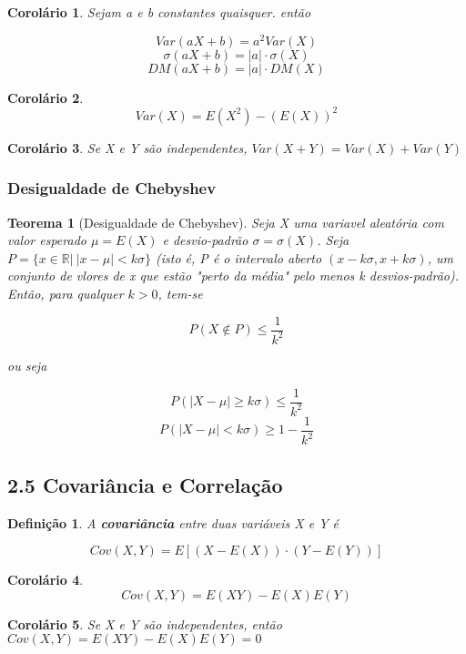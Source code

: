 \documentclass[12pt]{article}
\newtheorem{theorem}{Teorema}[section]
\newtheorem{corollary}{Corolário}[theorem]
\newtheorem{definition}{Definição}
\begin{document}
\begin{corollary}
    Sejam a e b constantes quaisquer. então
    
    $$Var(a X + b) = a^2 Var(X)$$
    $$\sigma (a X + b) = |a| \cdot \sigma(X)$$
    $$D M(a X + b) = |a| \cdot D M(X)$$
\end{corollary}

\begin{corollary}
    $$Var(X) = E(X^2) - (E(X))^2$$
\end{corollary}

\begin{corollary}
    Se X e Y são independentes, $Var(X + Y) = Var(X) + Var(Y)$
\end{corollary}

\subsubsection*{Desigualdade de Chebyshev}
\begin{theorem}[Desigualdade de Chebyshev]
    Seja X uma variavel aleatória com valor esperado $\mu = E(X)$ e desvio-padrão $\sigma = \sigma(X)$. Seja $P = \{ x \in \mathbb{R} | \ |x-\mu| < k \sigma \}$ (isto é, P é o intervalo aberto $(x - k \sigma, x + k \sigma)$, um conjunto de vlores de x que estão "perto da média" pelo menos k desvios-padrão). Então, para qualquer $k > 0$, tem-se
    
    $$P(X \notin P) \leq \dfrac{1}{k^2}$$
    
    ou seja
    
    $$P(|X - \mu| \geq k \sigma) \leq \dfrac{1}{k^2}$$
    $$P(|X - \mu| < k \sigma) \geq 1 - \dfrac{1}{k^2}$$
\end{theorem}

\subsection*{2.5 Covariância e Correlação}
\label{s9}

\begin{definition}
    A \textbf{covariância} entre duas variáveis X e Y é 
    
    $$Cov (X, Y) = E[(X - E(X)) \cdot(Y - E(Y))]$$
\end{definition}

\begin{corollary}
    $$Cov(X, Y) = E(XY) - E(X) E(Y)$$
\end{corollary}

\begin{corollary}
    Se X e Y são independentes, então $Cov(X, Y) = E(XY) - E(X) E(Y) = 0$
\end{corollary}
\end{document}
